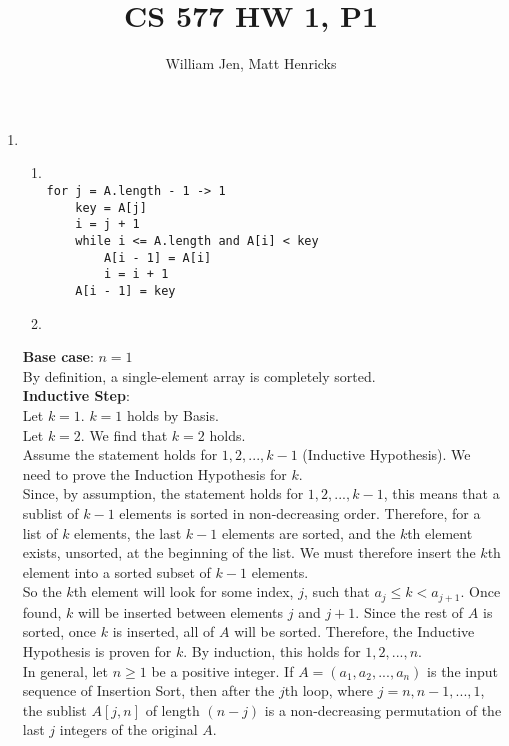 \documentclass{article}
\title{CS 577 HW 1, P1}
\author{William Jen, Matt Henricks}
\date{}
\begin{document}
\maketitle

\begin{enumerate}
    \item
        \begin{enumerate}
            \item
                \begin{verbatim}

for j = A.length - 1 -> 1
    key = A[j]
    i = j + 1
    while i <= A.length and A[i] < key
        A[i - 1] = A[i]
        i = i + 1
    A[i - 1] = key
                \end{verbatim}
                
            \item 
                
        \end{enumerate}
        \begin{enumerate}
        \textbf{Base case}: $n = 1$ \\
        By definition, a single-element array is completely sorted.\\
        
        \textbf{Inductive Step}: \\
        Let $k = 1$. $k = 1$ holds by Basis.\\
        Let $k = 2$. We find that $k = 2$ holds.\\
        
        Assume the statement holds for $1, 2, ..., k - 1$ (Inductive Hypothesis). We need to prove the Induction Hypothesis for $k$.\\
        
        Since, by assumption, the statement holds for $1, 2, ..., k - 1$, this means that a sublist of $k - 1$ elements is sorted in non-decreasing order. Therefore, for a list of $k$ elements, the last $k-1$ elements are sorted, and the $k$th element exists, unsorted, at the beginning of the list. We must therefore insert the $k$th element into a sorted subset of $k-1$ elements.\\
        
        So the $k$th element will look for some index, $j$, such that $a_j \leq k < a_{j+1}$. Once found, $k$ will be inserted between elements $j$ and $j+1$. Since the rest of $A$ is sorted, once $k$ is inserted, all of $A$ will be sorted. Therefore, the Inductive Hypothesis is proven for $k$. By induction, this holds for $1, 2, ..., n$.\\
        
        In general, let $n \geq 1$ be a positive integer. If $A = (a_1, a_2, ..., a_n)$ is the input sequence of Insertion Sort, then after the $j$th loop, where $j = n, n - 1, ..., 1$, the sublist $A[j, n]$ of length $(n-j)$ is a non-decreasing permutation of the last $j$ integers of the original $A$. \\
        
        
        \end{enumerate}
\end{enumerate}
\end{document}
